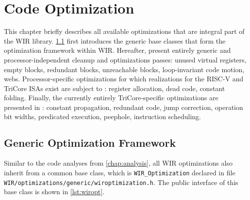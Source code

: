 \chapter{Code Optimization}
\label{chap:optimization}
\renewcommand{\sectiontitle}{}

This chapter briefly describes all available optimizations that are integral part of the \gls{WIR} library.
\cref{sec:opt} first introduces the generic base classes that form the optimization framework within \gls{WIR}.
Hereafter,  present entirely generic and processor-independent cleanup and optimizations passes: unused virtual registers, empty blocks, redundant blocks, unreachable blocks, loop-invariant code motion, webs.
Processor-specific optimizations for which realizations for the RISC-V and TriCore \glspl{ISA} exist are subject to : register allocation, dead code, constant folding.
Finally, the currently entirely TriCore-specific optimizations are presented in : constant propagation, redundant code, jump correction, operation bit widths, predicated execution, peephole, instruction scheduling.


\section{Generic Optimization Framework}
\label{sec:opt}

Similar to the code analyses from \cref{chap:analysis}, all \gls{WIR} optimizations also inherit from a common base class, which is \texttt{WIR\_Optimization} declared in file \texttt{WIR/optimizations/generic/wiroptimization.h}.
The public interface of this base class is shown in \cref{lst:wiropt}.

